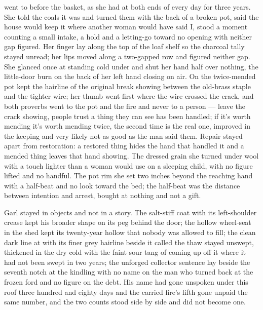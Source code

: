 \scenebreak

 went to  before the basket, as she had at both ends of every day for three years. She told the coals it was  and turned them with the back of a broken pot, said the house would keep it where another woman would have said I, stood a moment counting a small intake, a hold and a letting-go toward no opening with neither gap figured. Her finger lay along the top of the loaf shelf so the charcoal tally stayed unread; her lips moved along a two-gapped row and figured neither gap. She glanced once at  standing cold under  and shut her hand half over nothing, the little-door burn on the back of her left hand closing on air. On  the twice-mended pot kept the hairline of the original break showing between the old-brass staple and the tighter wire; her thumb went first where the wire crossed the crack, and both proverbs went to the pot and the fire and never to a person --- leave the crack showing, people trust a thing they can see has been handled; if it's worth mending it's worth mending twice, the second time is the real one, improved in the keeping and very likely not as good as the man said them. Repair stayed apart from restoration: a restored thing hides the hand that handled it and a mended thing leaves that hand showing. The dressed grain she turned under wool with a touch lighter than a woman would use on a sleeping child, with no figure lifted and no handful. The pot rim she set two inches beyond the reaching hand with a half-beat and no look toward the bed; the half-beat was the distance between intention and arrest, bought at nothing and not a gift.

Garl stayed in objects and not in a story. The salt-stiff coat with its left-shoulder crease kept his broader shape on its peg behind the door; the hollow wheel-seat in the shed kept its twenty-year hollow that nobody was allowed to fill; the clean dark line at  with its finer grey hairline beside it called the thaw stayed unswept, thickened in the dry cold with the faint sour tang of  coming up off it where it had not been swept in two years; the unforged collector sentence lay beside the seventh notch at the kindling with no name on the man who turned back at the frozen ford and no figure on the debt. His name had gone unspoken under this roof three hundred and eighty days and the carried fire's fifth gone unpaid the same number, and the two counts stood side by side and did not become one.


